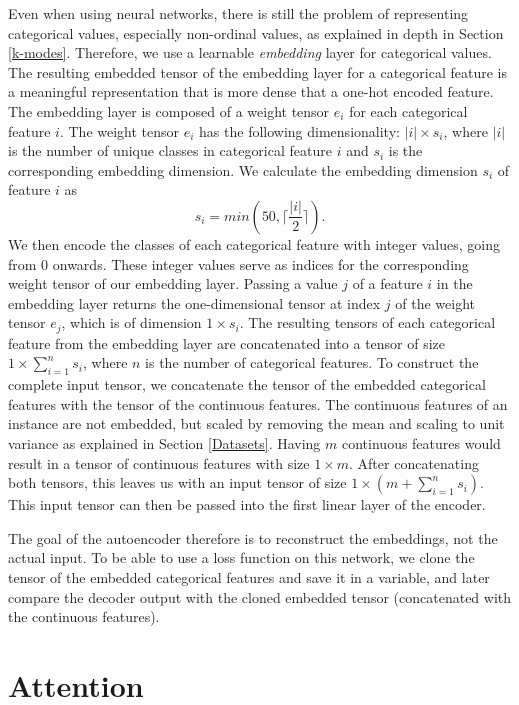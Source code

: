Even when using neural networks, there is still the problem of representing categorical values, especially non-ordinal values, as explained in depth in Section \ref{k-modes}. Therefore, we use a learnable \textit{embedding} layer for categorical values. The resulting embedded tensor of the embedding layer for a categorical feature is a meaningful representation that is more dense that a one-hot encoded feature. The embedding layer is composed of a weight tensor $e_i$ for each categorical feature $i$. The weight tensor $e_i$  has the following dimensionality: $|i| \times s_i$, where $|i|$ is the number of unique classes in categorical feature $i$ and $s_i$ is the corresponding embedding dimension. We calculate the embedding dimension $s_i$ of feature $i$ as
$$s_i = min(50, \lceil \frac{|i|}{2} \rceil).$$
We then encode the classes of each categorical feature with integer values, going from 0 onwards. These integer values serve as indices for the corresponding weight tensor of our embedding layer. Passing a value $j$ of a feature $i$ in the embedding layer returns the one-dimensional tensor at index $j$ of the weight tensor $e_j$, which is of dimension $1 \times s_i$. The resulting tensors of each categorical feature from the embedding layer are concatenated into a tensor of size $1 \times \sum^n_{i=1}s_i$, where $n$ is the number of categorical features. To construct the complete input tensor, we concatenate the tensor of the embedded categorical features with the tensor of the continuous features. The continuous features of an instance are not embedded, but scaled by removing the mean and scaling to unit variance as explained in Section \ref{Datasets}. Having $m$ continuous features would result in a tensor of continuous features with size $1 \times m$. After concatenating both tensors, this leaves us with an input tensor of size $1 \times (m + \sum^n_{i=1}s_i)$. This input tensor can then be passed into the first linear layer of the encoder.

The goal of the autoencoder therefore is to reconstruct the embeddings, not the actual input. To be able to use a loss function on this network, we clone the tensor of the embedded categorical features and save it in a variable, and later compare the decoder output with the cloned embedded tensor (concatenated with the continuous features).

\section{Attention} \label{Attention}


